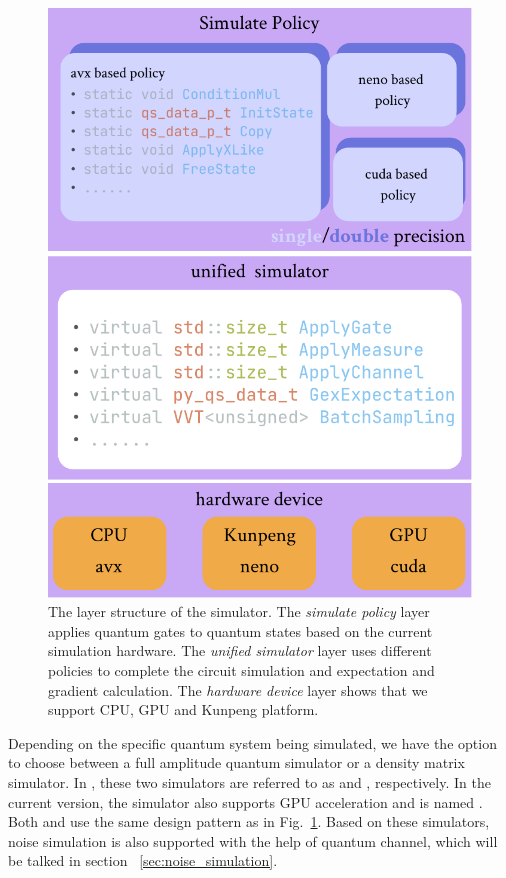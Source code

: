 \begin{figure}[ht]
    \centering
    \includegraphics[scale=0.6]{./images/3_1_simulator_structure.pdf}
    \captionsetup{justification=raggedright,singlelinecheck=false}
    \caption{\label{3_1_sim_str} The layer structure of the simulator. The \textit{simulate policy} layer applies quantum gates to quantum states based on the current simulation hardware. The \textit{unified simulator} layer uses different policies to complete the circuit simulation and expectation and gradient calculation. The \textit{hardware device} layer shows that we support CPU, GPU and Kunpeng platform.}
\end{figure}

Depending on the specific quantum system being simulated, we have the option to choose between a full amplitude quantum simulator or a density matrix simulator. In \MindQuantum, these two simulators are referred to as  and , respectively. In the current \version version, the  simulator also supports GPU acceleration and is named . Both  and  use the same design pattern as in Fig.~\ref{3_1_sim_str}. Based on these simulators, noise simulation is also supported with the help of quantum channel, which will be talked in section ~\ref{sec:noise_simulation}.


